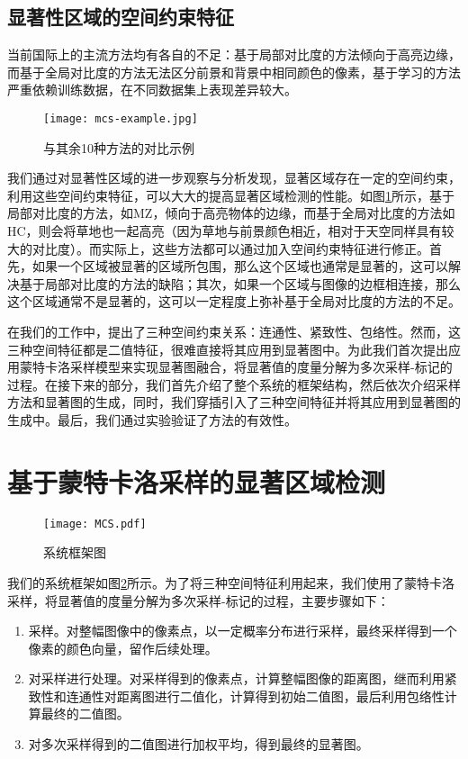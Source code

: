\subsection{显著性区域的空间约束特征}
当前国际上的主流方法均有各自的不足：基于局部对比度的方法倾向于高亮边缘，而基于全局对比度的方法无法区分前景和背景中相同颜色的像素，基于学习的方法严重依赖训练数据，在不同数据集上表现差异较大。

\begin{figure}
\centering
\texttt{[image: mcs-example.jpg]}
\caption{与其余10种方法的对比示例}\label{fig:mcs_comp}
\end{figure}

我们通过对显著性区域的进一步观察与分析发现，显著区域存在一定的空间约束，利用这些空间约束特征，可以大大的提高显著区域检测的性能。如图\ref{fig:mcs_comp}所示，基于局部对比度的方法，如MZ\cite{ma2003contrast}，倾向于高亮物体的边缘，而基于全局对比度的方法如HC\cite{cheng2011global}，则会将草地也一起高亮（因为草地与前景颜色相近，相对于天空同样具有较大的对比度）。而实际上，这些方法都可以通过加入空间约束特征进行修正。首先，如果一个区域被显著的区域所包围，那么这个区域也通常是显著的，这可以解决基于局部对比度的方法的缺陷；其次，如果一个区域与图像的边框相连接，那么这个区域通常不是显著的，这可以一定程度上弥补基于全局对比度的方法的不足。

在我们的工作中，提出了三种空间约束关系：连通性、紧致性、包络性。然而，这三种空间特征都是二值特征，很难直接将其应用到显著图中。为此我们首次提出应用蒙特卡洛采样模型来实现显著图融合，将显著值的度量分解为多次采样-标记的过程。在接下来的部分，我们首先介绍了整个系统的框架结构，然后依次介绍采样方法和显著图的生成，同时，我们穿插引入了三种空间特征并将其应用到显著图的生成中。最后，我们通过实验验证了方法的有效性。

\section{基于蒙特卡洛采样的显著区域检测}
\begin{figure}
\centering
\texttt{[image: MCS.pdf]}
\caption{系统框架图}\label{fig:mcs}
\end{figure}

我们的系统框架如图\ref{fig:mcs}所示。为了将三种空间特征利用起来，我们使用了蒙特卡洛采样，将显著值的度量分解为多次采样-标记的过程，主要步骤如下：
\begin{enumerate}
\item 采样。对整幅图像中的像素点，以一定概率分布进行采样，最终采样得到一个像素的颜色向量，留作后续处理。
\item 对采样进行处理。对采样得到的像素点，计算整幅图像的距离图，继而利用紧致性和连通性对距离图进行二值化，计算得到初始二值图，最后利用包络性计算最终的二值图。
\item 对多次采样得到的二值图进行加权平均，得到最终的显著图。
\end{enumerate}

